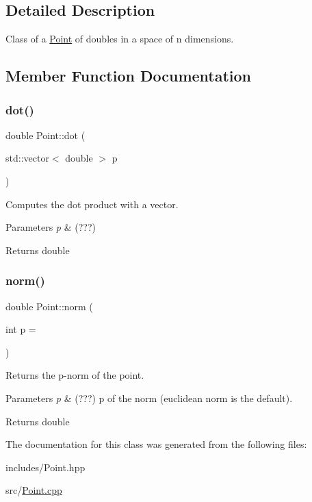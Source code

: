 \subsection{Detailed Description}
Class of a \hyperlink{class_point}{Point} of doubles in a space of n dimensions. 

\subsection{Member Function Documentation}
\mbox{\label{class_point_a9d8da6733d7e4110a62e8d0f82676761}} 
\subsubsection{\texorpdfstring{dot()}{dot()}}
{\footnotesize\ttfamily double Point\+::dot (\begin{DoxyParamCaption}\item[{std\+::vector$<$ double $>$}]{p }\end{DoxyParamCaption})}



Computes the dot product with a vector. 


\begin{DoxyParams}{Parameters}
{\em p} & (???) \\
\hline
\end{DoxyParams}
\begin{DoxyReturn}{Returns}
double 
\end{DoxyReturn}
\mbox{\label{class_point_aab64e3f0a9eecba00a1607eb4c7768c3}} 
\subsubsection{\texorpdfstring{norm()}{norm()}}
{\footnotesize\ttfamily double Point\+::norm (\begin{DoxyParamCaption}\item[{int}]{p = {} }\end{DoxyParamCaption})}



Returns the p-\/norm of the point. 


\begin{DoxyParams}{Parameters}
{\em p} & (???) p of the norm (euclidean norm is the default). \\
\hline
\end{DoxyParams}
\begin{DoxyReturn}{Returns}
double 
\end{DoxyReturn}


The documentation for this class was generated from the following files\+:\begin{DoxyCompactItemize}
\item 
includes/Point.\+hpp\item 
src/\hyperlink{_point_8cpp}{Point.\+cpp}\end{DoxyCompactItemize}

